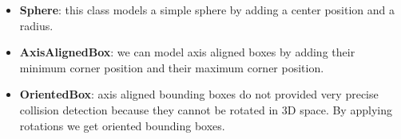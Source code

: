\begin{itemize}
	\item \textbf{Sphere}: this class models a simple sphere by adding a center position and a radius.
	
	\item \textbf{AxisAlignedBox}: we can model axis aligned boxes by adding their minimum corner position and
	their maximum corner position.
	
	\item \textbf{OrientedBox}: axis aligned bounding boxes do not provided very precise collision detection because
	they cannot be rotated in 3D space. By applying rotations we get oriented bounding boxes.
\end{itemize}